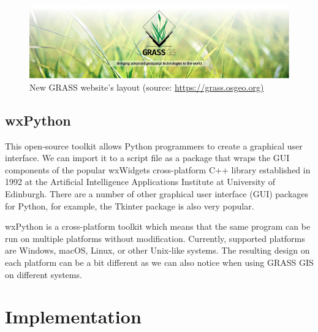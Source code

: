\documentclass[a4paper,10pt,twoside]{article}
\begin{document}
\vspace{0.3cm}
\begin{figure}[hbt!]
\begin{center}
\includegraphics[width=15cm]{../pictures/grass_gis.png} 
\caption[New GRASS website's layout]{New GRASS website's layout (source: \url{https://grass.osgeo.org)}}
\label{fig:grass_gis}
\end{center}
\end{figure}

\subsection{wxPython}
\noindent
\large

\noindent This open-source toolkit allows Python programmers to create a graphical user interface. We can import it to a script file as a package that wraps the GUI components of the popular wxWidgets cross-platform C++ library established in 1992 at the Artificial Intelligence Applications Institute at University of Edinburgh. There are a number of other graphical user interface (GUI) packages for Python, for example, the Tkinter package is also very popular.

wxPython is a cross-platform toolkit which means that the same program can be run on multiple platforms without modification. Currently, supported platforms are Windows, macOS, Linux, or other Unix-like systems. The resulting design on each platform can be a bit different as we can also notice when using GRASS GIS on different systems. 


\newpage
\vspace*{-1cm}
\section{Implementation}
\noindent
\large

\newpage
\vspace*{-1cm}
\end{document}
